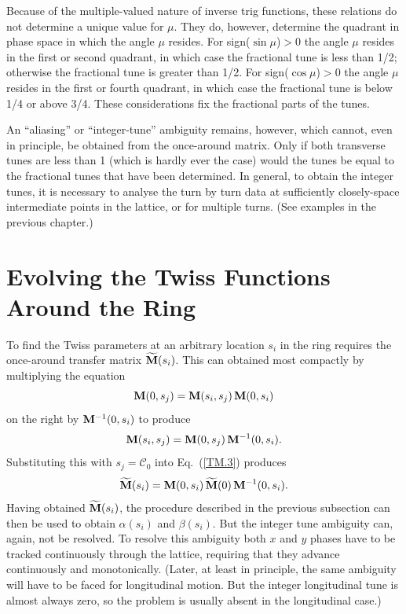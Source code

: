 \documentclass[]{article}
\begin{document}
Because of the multiple-valued nature of inverse trig functions,
these relations do not determine a unique value for $\mu$. They do,
however, determine the quadrant in phase space in which the angle $\mu$
resides. For sign($\sin\mu$)$>$0 the angle $\mu$ resides in the first
or second quadrant, in which case the fractional tune is less than 1/2;
otherwise the fractional tune is greater than 1/2.
For sign($\cos\mu$)$>$0 the angle $\mu$ resides in the first
or fourth quadrant, in which case the fractional tune is below 1/4
or above 3/4. These considerations fix the fractional parts of
the tunes.

An ``aliasing'' or ``integer-tune'' ambiguity remains, however,
which cannot, even in principle, be obtained from the once-around 
matrix. Only if both transverse tunes are less than 1 (which is 
hardly ever the
case) would the tunes be equal to the fractional tunes that have
been determined. In general, to obtain the integer tunes, it is 
necessary to analyse the turn by turn data at sufficiently closely-space 
intermediate points in the lattice, or for multiple turns. (See examples in the previous chapter.)

\section{Evolving the Twiss Functions Around the Ring}
To find the Twiss parameters at an arbitrary location $s_i$ in the
ring requires the once-around transfer matrix ${\widetilde{\bf M}}(s_i)$. 
This can obtained most compactly by multiplying the equation
%
\begin{equation}
{\bf M}(0,s_j)
 =
{\bf M}(s_i,s_j)\,{\bf M}(0,s_i)
\label{TM.9}
\end{equation}
%
on the right by ${\bf M}^{-1}(0,s_i)$ to produce
%
\begin{equation}
{\bf M}(s_i,s_j)
 =
{\bf M}(0,s_j)\,{\bf M}^{-1}(0,s_i).
\label{TM.10}
\end{equation}
%
Substituting this with $s_j=\mathcal{C}_0$ into Eq.~(\ref{TM.3}) 
produces
%
\begin{equation}
\widetilde{\bf M}(s_i)
 =
{\bf M}(0,s_i)\,\widetilde{\bf M}(0)\,{\bf M}^{-1}(0,s_i).
\label{TM.11}
\end{equation}
%
Having obtained ${\widetilde{\bf M}}(s_i)$,
the procedure described in the previous subsection can
then be used to obtain $\alpha(s_i)$ and $\beta(s_i)$.
But the integer tune ambiguity can, again, not be
resolved. To resolve this ambiguity both $x$ and $y$ phases
have to be tracked continuously through the lattice,
requiring that they advance continuously and monotonically.
(Later, at least in principle, the same ambiguity will 
have to be faced for longitudinal motion. But the
integer longitudinal tune is almost always zero, so the
problem is usually absent in the longitudinal case.)
\end{document}
